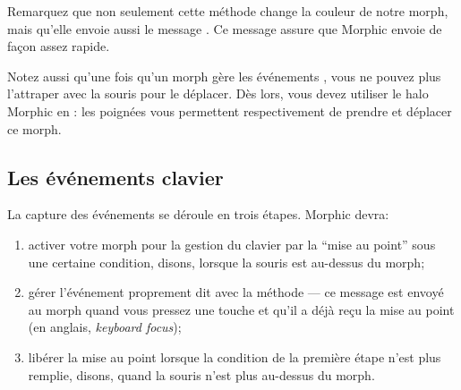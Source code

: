 \documentclass[a4paper,10pt,twoside]{book}
\begin{document}
Remarquez que non seulement cette méthode change la couleur de notre
morph, mais qu'elle envoie aussi le message .
Ce message assure que Morphic envoie 
de façon assez rapide.


Notez aussi qu'une fois qu'un morph gère les événements , vous ne pouvez plus l'attraper avec la souris pour le déplacer.
Dès lors, vous devez utiliser le halo Morphic en \arelire{\metaclickant}: les poignées 
vous permettent respectivement de prendre et déplacer ce morph.


\subsection{Les événements clavier}

La capture des événements  se déroule en trois
étapes. Morphic devra:


\begin{enumerate}
	\item activer votre morph pour la gestion du clavier par la ``mise
      au point'' sous une certaine condition, disons, lorsque la souris est au-dessus du morph; 
	\item gérer l'événement proprement dit avec la méthode
       --- ce message est envoyé au
      morph quand vous pressez une touche et qu'il a déjà reçu
      la mise au point  (en anglais, \emph{keyboard focus});
	\item libérer la mise au point lorsque la condition de la
      première étape n'est plus remplie, disons, quand la souris
      n'est plus au-dessus du morph.
\end{enumerate}
\end{document}
